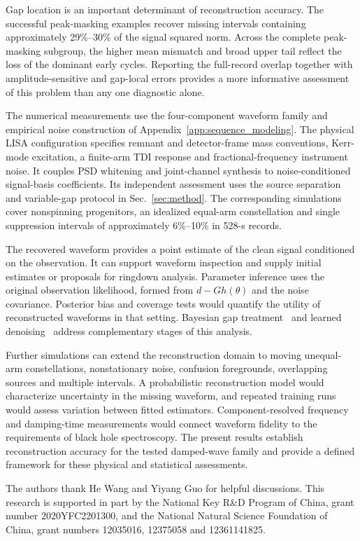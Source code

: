 \documentclass[10pt,prd,aps,a4paper,twocolumn,superscriptaddress,nofootinbib,floatfix]{revtex4-2}
\begin{document}
Gap location is an important determinant of reconstruction accuracy. The successful peak-masking examples recover missing intervals containing approximately 29\%--30\% of the signal squared norm. Across the complete peak-masking subgroup, the higher mean mismatch and broad upper tail reflect the loss of the dominant early cycles. Reporting the full-record overlap together with amplitude-sensitive and gap-local errors provides a more informative assessment of this problem than any one diagnostic alone.

The numerical measurements use the four-component waveform family and empirical noise construction of Appendix~\ref{app:sequence_modeling}. The physical LISA configuration specifies remnant and detector-frame mass conventions, Kerr-mode excitation, a finite-arm TDI response and fractional-frequency instrument noise. It couples PSD whitening and joint-channel synthesis to noise-conditioned signal-basis coefficients. Its independent assessment uses the source separation and variable-gap protocol in Sec.~\ref{sec:method}. The corresponding simulations cover nonspinning progenitors, an idealized equal-arm constellation and single suppression intervals of approximately 6\%--10\% in 528-s records.

The recovered waveform provides a point estimate of the clean signal conditioned on the observation. It can support waveform inspection and supply initial estimates or proposals for ringdown analysis. Parameter inference uses the original observation likelihood, formed from $d-Gh(\theta)$ and the noise covariance. Posterior bias and coverage tests would quantify the utility of reconstructed waveforms in that setting. Bayesian gap treatment~\cite{Baghi2019} and learned denoising~\cite{Wang:2024waveformer} address complementary stages of this analysis.

Further simulations can extend the reconstruction domain to moving unequal-arm constellations, nonstationary noise, confusion foregrounds, overlapping sources and multiple intervals. A probabilistic reconstruction model would characterize uncertainty in the missing waveform, and repeated training runs would assess variation between fitted estimators. Component-resolved frequency and damping-time measurements would connect waveform fidelity to the requirements of black hole spectroscopy. The present results establish reconstruction accuracy for the tested damped-wave family and provide a defined framework for these physical and statistical assessments.

\begin{acknowledgments}
The authors thank He Wang and Yiyang Guo for helpful discussions. This research is supported in part by the National Key R\&D Program of China, grant number 2020YFC2201300, and the National Natural Science Foundation of China, grant numbers 12035016, 12375058 and 12361141825.

\end{acknowledgments}
\appendix
\end{document}
